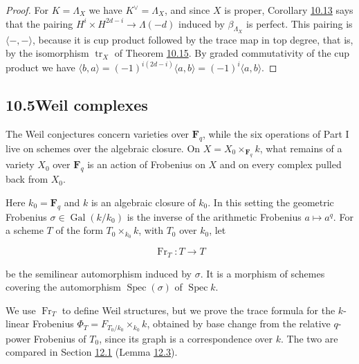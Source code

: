 \documentclass[11pt]{article}
\begin{document}
\begin{proof}[{Proof}]\label{bp153}%
For \(K=\Lambda_X\) we have \(K^\vee=\Lambda_X\), and since \(X\) is proper, Corollary \hyperref[bp140]{10.13} says that the pairing \(H^i\times H^{2d-i}\to\Lambda(-d)\) induced by \(\beta_{\Lambda_X}\) is perfect. This pairing is \(\langle-,-\rangle\), because it is cup product followed by the trace map in top degree, that is, by the isomorphism \(\operatorname{tr}_X\) of Theorem \hyperref[bp146]{10.15}. By graded commutativity of the cup product we have \(\langle b,a\rangle=(-1)^{i(2d-i)}\langle a,b\rangle
=(-1)^i\langle a,b\rangle\).
\end{proof}


\subsection*{\texorpdfstring{10.5\quad Weil complexes}{10.5 Weil complexes}}
\label{bp154}%
\label{bp155}%
The Weil conjectures concern varieties over \(\mathbf F_q\), while the six operations of Part I live on schemes over the algebraic closure. On \(X=X_0\times_{\mathbf F_q}k\), what remains of a variety \(X_0\) over \(\mathbf F_q\) is an action of Frobenius on \(X\) and on every complex pulled back from \(X_0\).

Here \(k_0=\mathbf F_q\) and \(k\) is an algebraic closure of \(k_0\). In this setting the geometric Frobenius \(\sigma\in\operatorname{Gal}(k/k_0)\) is the inverse of the arithmetic Frobenius \(a\mapsto a^q\). For a scheme \(T\) of the form \(T_0\times_{k_0}k\), with \(T_0\) over \(k_0\), let

\[
\operatorname{Fr}_T:T\longrightarrow T
\]

be the semilinear automorphism induced by \(\sigma\). It is a morphism of schemes covering the automorphism \(\operatorname{Spec}(\sigma)\) of \(\operatorname{Spec}k\).

We use \(\operatorname{Fr}_T\) to define Weil structures, but we prove the trace formula for the \(k\)-linear Frobenius \(\Phi_T=F_{T_0/k_0}\times_{k_0}k\), obtained by base change from the relative \(q\)-power Frobenius of \(T_0\), since its graph is a correspondence over \(k\). The two are compared in Section \hyperref[bp230]{12.1} (Lemma \hyperref[bp234]{12.3}).
\end{document}
